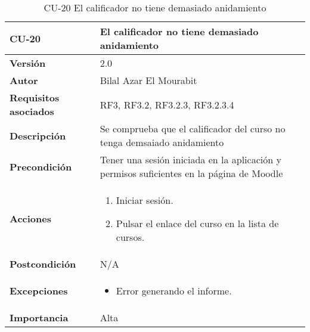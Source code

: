 \begin{table}[H]
	\centering
	\begin{tabularx}{\linewidth}{ p{} p{} }
		\toprule
		\textbf{CU-20}    & \textbf{El calificador no tiene demasiado anidamiento}\\
		\toprule
		\textbf{Versión}              & 2.0    \\
		\textbf{Autor}                & Bilal Azar El Mourabit \\
		\textbf{Requisitos asociados} & RF3, RF3.2, RF3.2.3, RF3.2.3.4 \\
		\textbf{Descripción}          & Se comprueba que el calificador del curso no tenga demsaiado anidamiento\\
    		\textbf{Precondición}         & Tener una sesión iniciada en la aplicación y permisos suficientes en la página de Moodle\\
		\textbf{Acciones}             & 
		\begin{enumerate}
			\def\labelenumi{\arabic{enumi}.}
			\tightlist
			\item Iniciar sesión.
            \item Pulsar el enlace del curso en la lista de cursos. 
		\end{enumerate}\\
		\textbf{Postcondición}        & N/A \\
		\textbf{Excepciones}          & \begin{itemize}
		    \item Error generando el informe.
		\end{itemize} \\
		\textbf{Importancia}          & Alta \\
		\bottomrule
	\end{tabularx}
	\caption{CU-20 El calificador no tiene demasiado anidamiento}
\end{table}

